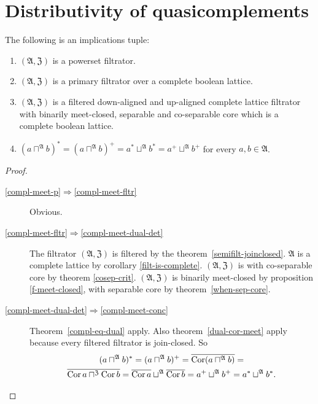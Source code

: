 \section{Distributivity of quasicomplements}
\begin{thm}
\label{f-compl-meet}The following is an implications tuple:
\begin{enumerate}
\item \label{compl-meet-p}$(\mathfrak{A},\mathfrak{Z})$ is a powerset
filtrator.
\item \label{compl-meet-fltr}$(\mathfrak{A},\mathfrak{Z})$ is a primary
filtrator over a complete boolean lattice.
\item \label{compl-meet-dual-det}$(\mathfrak{A},\mathfrak{Z})$ is a filtered down-aligned and up-aligned
complete lattice filtrator with binarily meet-closed, separable and
co-separable core which is a complete boolean lattice.
\item \label{compl-meet-conc}$(a\sqcap^{\mathfrak{A}}b)^{\ast}=(a\sqcap^{\mathfrak{A}}b)^{+}=a^{\ast}\sqcup^{\mathfrak{A}}b^{\ast}=a^{+}\sqcup^{\mathfrak{A}}b^{+}$
for every $a,b\in\mathfrak{A}$.
\end{enumerate}
\end{thm}
\begin{proof}
~
\begin{description}
\item [{\ref{compl-meet-p}$\Rightarrow$\ref{compl-meet-fltr}}] Obvious.

\item [{\ref{compl-meet-fltr}$\Rightarrow$\ref{compl-meet-dual-det}}] The
filtrator $(\mathfrak{A},\mathfrak{Z})$ is filtered by the theorem~\ref{semifilt-joinclosed}.
$\mathfrak{A}$ is a complete lattice by corollary \ref{filt-is-complete}.
$(\mathfrak{A},\mathfrak{Z})$ is with co-separable core by theorem
\ref{cosep-crit}.
$(\mathfrak{A},\mathfrak{Z})$ is
binarily meet-closed by proposition \ref{f-meet-closed}, with separable
core by theorem~\ref{when-sep-core}.


\item [{\ref{compl-meet-dual-det}$\Rightarrow$\ref{compl-meet-conc}}]
Theorem~\ref{compl-eq-dual} apply.
Also theorem~\ref{dual-cor-meet} apply because every filtered filtrator is join-closed.
So
\begin{multline*}
(a\sqcap^{\mathfrak{A}}b)^{\ast}=(a\sqcap^{\mathfrak{A}}b)^{+}=\overline{\operatorname{Cor}(a\sqcap^{\mathfrak{A}}b)}=\\\overline{\operatorname{Cor} a\sqcap^{\mathfrak{Z}}\operatorname{Cor} b}=\overline{\operatorname{Cor} a}\sqcup^{\mathfrak{A}}\overline{\operatorname{Cor} b}=a^{+}\sqcup^{\mathfrak{A}}b^{+}=a^{\ast}\sqcup^{\mathfrak{A}}b^{\ast}.
\end{multline*}
\end{description}
\end{proof}

